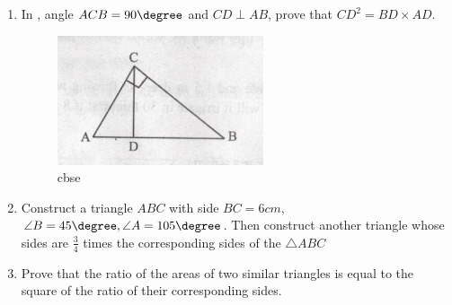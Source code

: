 \begin{enumerate}
\begin{figure}[H]
			
		\end{figure} 
\item In , angle $ACB = 90\degree$ and $CD \perp AB$, prove that $CD ^ 2 = BD \times AD$.
\begin{figure}[H]                                                            \centering
                        \includegraphics[width=\columnwidth]{figs/i3.jpeg}
			\caption{cbse}
			\label{fig:construction_732}
                \end{figure}
                
\item Construct a triangle $ABC$ with side $BC = 6 cm$, $\angle B=45\degree, \angle A= 105\degree$. Then construct another triangle whose sides are $\frac{3}{4}$ times the corresponding sides of the $\triangle ABC$
\item Prove that the ratio of the areas of two similar triangles is equal to the square of the ratio of their corresponding sides. 
\end{enumerate}

